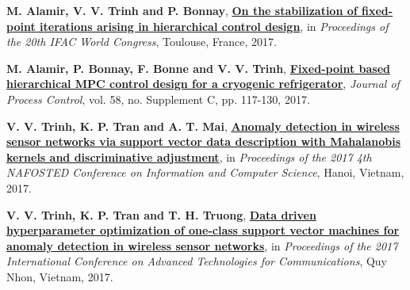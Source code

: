 \documentclass[a4paper,11pt]{article}
\begin{document}
	\textbf{M. Alamir, V. V. Trinh and P. Bonnay}, \href{https://doi.org/10.1016/j.ifacol.2017.08.1363}{\textbf{On the stabilization of fixed-point iterations arising in hierarchical control design}}, in \emph{Proceedings of the 20th IFAC World Congress}, Toulouse, France, 2017. 
	
	\vspace{0.2cm}
	
	\textbf{M. Alamir, P. Bonnay, F. Bonne and V. V. Trinh}, \href{https://doi.org/10.1016/j.jprocont.2017.09.006}{\textbf{Fixed-point based hierarchical MPC control design for a cryogenic refrigerator}}, \emph{Journal of Process Control}, vol. 58, no. Supplement C, pp. 117-130, 2017. 
	
	\vspace{0.2cm}
	
	\textbf{V. V. Trinh, K. P. Tran and A. T. Mai}, \href{https://doi.org/10.1109/NAFOSTED.2017.8108030}{\textbf{Anomaly detection in wireless sensor networks via support vector data description with Mahalanobis kernels and discriminative adjustment}}, in \emph{Proceedings of the 2017 4th NAFOSTED Conference on Information and Computer Science}, Hanoi, Vietnam, 2017. 
	
	\vspace{0.2cm}
	
	\textbf{V. V. Trinh, K. P. Tran and T. H. Truong}, \href{https://doi.org/10.1109/ATC.2017.8167642}{\textbf{Data driven hyperparameter optimization of one-class support vector machines for anomaly detection in wireless sensor networks}}, in \emph{Proceedings of the 2017 International Conference on Advanced Technologies for Communications}, Quy Nhon, Vietnam, 2017. 
	
\end{document}
